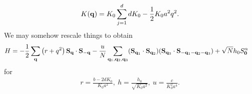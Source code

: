 \begin{align*}
	K(\vb{q}) = K_{0}\sum\limits_{j = 1}^{d}dK_{0} - \frac{1}{2}K_{0}a^{2}q^{2}.
\end{align*}
We may somehow rescale things to obtain
\begin{align*}
	H &= -\frac{1}{2}\sum\limits_{\vb{q}}\left(r + q^{2}\right)\vb{S}_{\vb{q}}\cdot\vb{S}_{-\vb{q}} - \frac{u}{N}\sum\limits_{\vb{q}_{1}, \vb{q}_{2}, \vb{q}_{3}}(\vb{S}_{\vb{q}_{1}}\cdot\vb{S}_{\vb{q}_{2}})(\vb{S}_{\vb{q}_{3}}\cdot\vb{S}_{-\vb{q}_{1} - \vb{q}_{2} - \vb{q}_{3}}) + \sqrt{N}h_{0}S_{\vb{0}}^{\alpha}
\end{align*}
for
\begin{align*}
	r = \frac{b - 2dK_{0}}{K_{0}a^{2}},\ h = \frac{h_{0}}{\sqrt{K_{0}a^{2}}},\ u = \frac{c}{K_{0}^{2}a^{4}}.
\end{align*}

